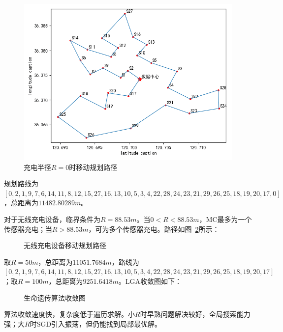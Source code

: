 \documentclass{whutmod}
\begin{document}
            \begin{figure}[H]
                \centering
                \includegraphics[width=.6\textwidth]{figures/w1.png}
                \caption{充电半径$R=0$时移动规划路径}\label{sssssssssss}
            \end{figure}

            规划路线为$[0, 2, 1, 9, 7, 6, 14, 11, 8, 12, 15, 27, 16, 13, 10, 5, 3, 4, 22, 28, 24, 23, 21, 29, 26, 25, 18, 19, 20, 17, 0]$，总距离为$11482.80289m$。

            对于无线充电设备，临界条件为$R=88.53m$。当$0<R<88.53m$，MC最多为一个传感器充电；当$R>88.53m$，可为多个传感器充电。路径如图~\ref{ssw}所示：

            \begin{figure}[H]
                \centering
                \caption{无线充电设备移动规划路径}\label{ssw}
            \end{figure}

            取$R=50m$，总距离为$11051.7684m$，路线为$[0, 2, 1, 9, 7, 6, 14, 11, 8, 12, 15, 27, 16, 13, 10, 5, 3, 4, 22, 28, 24, 23, 21, 29, 26, 25, 18, 19, 20, 17]$；取$R=100m$，总距离为$9251.6418m$。LGA收敛图如下：

            \begin{figure}[H]
                \centering
                \caption{生命遗传算法收敛图}
            \end{figure}

            算法收敛速度快，复杂度低于遍历求解。小$R$时早熟问题解决较好，全局搜索能力强；大$R$时SGD引入振荡，但仍能找到局部最优解。
\end{document}
